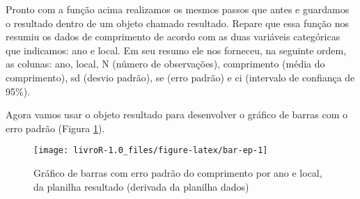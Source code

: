 \documentclass[14pt,titlepage, oneside, openany, a4paper]{book}
\newenvironment{Shaded}{\begin{snugshade}}{\end{snugshade}}
\newcommand{\DataTypeTok}[1]{\textcolor[rgb]{0.13,0.29,0.53}{#1}}
\newcommand{\DecValTok}[1]{\textcolor[rgb]{0.00,0.00,0.81}{#1}}
\newcommand{\FloatTok}[1]{\textcolor[rgb]{0.00,0.00,0.81}{#1}}
\newcommand{\KeywordTok}[1]{\textcolor[rgb]{0.13,0.29,0.53}{\textbf{#1}}}
\newcommand{\NormalTok}[1]{#1}
\newcommand{\OperatorTok}[1]{\textcolor[rgb]{0.81,0.36,0.00}{\textbf{#1}}}
\newcommand{\OtherTok}[1]{\textcolor[rgb]{0.56,0.35,0.01}{#1}}
\newcommand{\StringTok}[1]{\textcolor[rgb]{0.31,0.60,0.02}{#1}}
\begin{document}
Pronto com a função acima realizamos os mesmos passos que antes e guardamos o resultado dentro de um objeto chamado resultado. Repare que essa função nos resumiu os dados de comprimento de acordo com as duas variáveis categóricas que indicamos: ano e local. Em seu resumo ele nos forneceu, na seguinte ordem, as colunas: ano, local, N (número de observações), comprimento (média do comprimento), sd (desvio padrão), se (erro padrão) e ci (intervalo de confiança de 95\%).

Agora vamos usar o objeto resultado para desenvolver o gráfico de barras com o erro padrão (Figura \ref{fig:bar-ep}).

\begin{Shaded}
\end{Shaded}

\begin{figure}[H]
\texttt{[image: livroR-1.0\_files/figure-latex/bar-ep-1]} \caption{Gráfico de barras com erro padrão do comprimento por ano e local, da planilha resultado (derivada da planilha dados)}\label{fig:bar-ep}
\end{figure}
\end{document}
